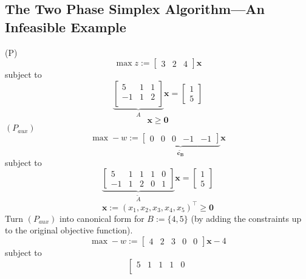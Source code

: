 \subsection{The Two Phase Simplex Algorithm---An Infeasible Example}
\begin{exbox}
    \begin{example}
        (P)
        \[ \max z:=\begin{bmatrix} 3 & 2 & 4 \end{bmatrix} \bm{x} \]
        subject to
        \[
            \underbrace{
                \begin{bmatrix}
                    5  & 1 & 1 \\
                    -1 & 1 & 2 \\
                \end{bmatrix}}_{A}
            \bm{x}=
            \begin{bmatrix}
                1 \\
                5
            \end{bmatrix}
        \]
        \[\bm{x}\geqslant  \bm{0}\]
        $ (P_{aux}) $
        \[ \max -w:=\underbrace{\left[\begin{array}{ccccc}
                        0 & 0 & 0 & -1 & -1
                    \end{array}\right]}_{\bm{\tilde{c_B}}} \bm{x} \]
        subject to
        \[
            \underbrace{\left[
                    \begin{array}{ccccc}
                        5  & 1 & 1 & 1 & 0 \\
                        -1 & 1 & 2 & 0 & 1
                    \end{array}\right]}_{\tilde{A}}
            \bm{x}=
            \begin{bmatrix}
                1 \\
                5
            \end{bmatrix}
        \]
        \[ \bm{x}:=(x_1,x_2,x_3,x_4,x_5)^\top \geqslant  \bm{0} \]
        Turn $ (P_{aux}) $ into canonical form for $ B:=\{4,5\} $ (by adding
        the constraints up to the original objective function).
        \[ \max -w:=\left[\begin{array}{ccccc}
                    4 & 2 & 3 & 0 & 0
                \end{array}\right] \bm{x} - 4 \]
        subject to
        \[
            \left[
                \begin{array}{ccccc}
                    5  & 1 & 1 & 1 & 0 \\

\end{array}\]
\end{example}
\end{exbox}
